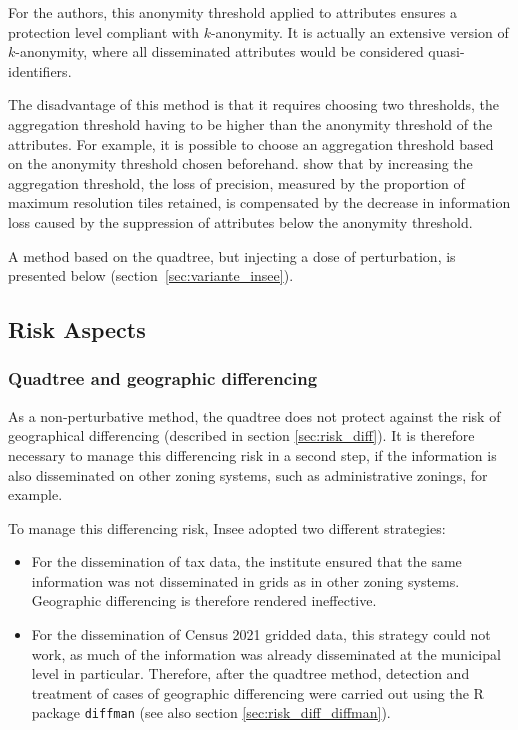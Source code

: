  For the authors, this anonymity threshold applied to attributes ensures a protection level compliant with $k$-anonymity. It is actually an extensive version of $k$-anonymity, where all disseminated attributes would be considered quasi-identifiers.

The disadvantage of this method is that it requires choosing two thresholds, the aggregation threshold having to be higher than the anonymity threshold of the attributes. For example, it is possible to choose an aggregation threshold based on the anonymity threshold chosen beforehand. \cite{Lagonigro_Oller_Martori_2017} show that by increasing the aggregation threshold, the loss of precision, measured by the proportion of maximum resolution tiles retained, is compensated by the decrease in information loss caused by the suppression of attributes below the anonymity threshold.

A method based on the quadtree, but injecting a dose of perturbation, is presented below (section~\ref{sec:variante_insee}).

\subsection{Risk Aspects}

\subsubsection{Quadtree and geographic differencing}

As a non-perturbative method, the quadtree does not protect against the risk of geographical differencing (described in section \ref{sec:risk_diff}). It is therefore necessary to manage this differencing risk in a second step, if the information is also disseminated on other zoning systems, such as administrative zonings, for example.

To manage this differencing risk, Insee adopted two different strategies:

\begin{itemize}
    \item For the dissemination of tax data, the institute ensured that the same information was not disseminated in grids as in other zoning systems. Geographic differencing is therefore rendered ineffective.
    \item For the dissemination of Census 2021 gridded data, this strategy could not work, as much of the information was already disseminated at the municipal level in particular. Therefore, after the quadtree method, detection and treatment of cases of geographic differencing were carried out using the R package \texttt{diffman} \citep{diffman} (see also section \ref{sec:risk_diff_diffman}).
\end{itemize}


